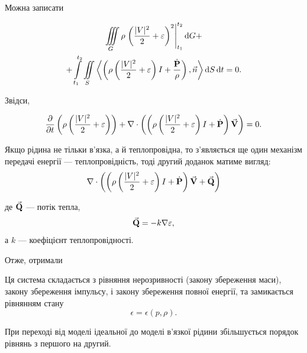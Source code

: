 Можна записати
\begin{law}
	\begin{multline}
		\Iiint_G \rho \left. \left( \frac{|V|^2}{2} + \epsilon\right)^2 \right|_{t_1}^{t_2} \diff G + \\
		+\Int_{t_1}^{t_2} \Iint_S \langle \left(\rho \left(\frac{|V|^2}{2} + \epsilon \right)I+\frac{\dot{\bf{P}}}{\rho}\right),\vec n\rangle \diff S \diff t = 0.
	\end{multline}
\end{law}

Звідси, 
\begin{law}
	\begin{equation}
		\frac{\partial}{\partial t} \left( \rho \left( \frac{|V|^2}{2} + \varepsilon\right)\right) + \nabla \cdot \left( \left( \rho \left(\frac{|V|^2}{2} + \varepsilon\right)I + \dot{\textbf{P}}\right) {\vec{\mathbf{V}}} \right) = 0.
	\end{equation}
\end{law}

Якщо рідина не тільки в'язка, а й теплопровідна, то з'являється ще один механізм передачі енергії --- теплопровідність, тоді другий доданок матиме вигляд:
\begin{equation}
	\nabla \cdot \left( \left( \rho \left(\frac{|V|^2}{2} + \varepsilon\right)I + \dot{\textbf{P}}\right) {\vec{\mathbf{V}}} + {\vec{\mathbf{Q}}}\right)
\end{equation}

де ${\vec{\mathbf{Q}}}$ --- потік тепла,
\begin{equation}
	{\vec{\mathbf{Q}}} = - k \nabla \varepsilon,
\end{equation}
а $k$ --- коефіцієнт теплопровідності. \medskip

Отже, отримали
\begin{th_equation}
	Ця система складається з рівняння нерозривності (закону збереження маси), закону збереження імпульсу, і закону збереження повної енергії, та замикається рівнянням стану
	\begin{equation}
		\epsilon = \epsilon(p, \rho).
	\end{equation}
\end{th_equation}

\begin{remark}
	При переході від моделі ідеальної до моделі в'язкої рідини збільшується порядок рівнянь з першого на другий.
\end{remark}

